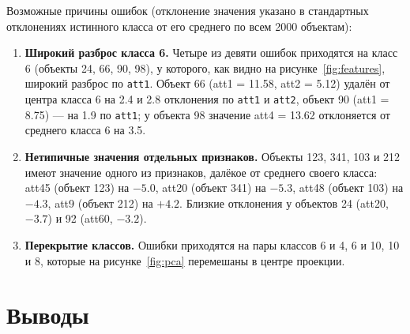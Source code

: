 \documentclass[14pt,a4paper]{extarticle}
\begin{document}
Возможные причины ошибок (отклонение значения указано в стандартных отклонениях истинного класса от его среднего по всем 2000 объектам):
\begin{enumerate}
\item \textbf{Широкий разброс класса 6.} Четыре из девяти ошибок приходятся на класс 6 (объекты 24, 66, 90, 98), у которого, как видно на рисунке~\ref{fig:features}, широкий разброс по \texttt{att1}. Объект 66 (att1 = 11.58, att2 = 5.12) удалён от центра класса 6 на 2.4 и 2.8 отклонения по \texttt{att1} и \texttt{att2}, объект 90 (att1 = 8.75) --- на 1.9 по \texttt{att1}; у объекта 98 значение att4 = 13.62 отклоняется от среднего класса 6 на 3.5.
\item \textbf{Нетипичные значения отдельных признаков.} Объекты 123, 341, 103 и 212 имеют значение одного из признаков, далёкое от среднего своего класса: att45 (объект 123) на $-5.0$, att20 (объект 341) на $-5.3$, att48 (объект 103) на $-4.3$, att9 (объект 212) на $+4.2$. Близкие отклонения у объектов 24 (att20, $-3.7$) и 92 (att60, $-3.2$).
\item \textbf{Перекрытие классов.} Ошибки приходятся на пары классов 6 и 4, 6 и 10, 10 и 8, которые на рисунке~\ref{fig:pca} перемешаны в центре проекции.
\end{enumerate}

\section*{Выводы}
\end{document}
